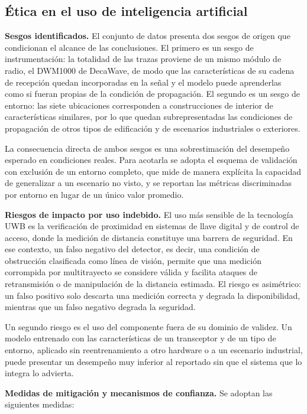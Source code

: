 \documentclass[
11pt, %
]{charter}
\begin{document}
\subsection{Ética en el uso de inteligencia artificial}

\textbf{Sesgos identificados.} El conjunto de datos presenta dos sesgos de origen que condicionan el alcance de las conclusiones. El primero es un sesgo de instrumentación: la totalidad de las trazas proviene de un mismo módulo de radio, el DWM1000 de DecaWave, de modo que las características de su cadena de recepción quedan incorporadas en la señal y el modelo puede aprenderlas como si fueran propias de la condición de propagación. El segundo es un sesgo de entorno: las siete ubicaciones corresponden a construcciones de interior de características similares, por lo que quedan subrepresentadas las condiciones de propagación de otros tipos de edificación y de escenarios industriales o exteriores.

La consecuencia directa de ambos sesgos es una sobrestimación del desempeño esperado en condiciones reales. Para acotarla se adopta el esquema de validación con exclusión de un entorno completo, que mide de manera explícita la capacidad de generalizar a un escenario no visto, y se reportan las métricas discriminadas por entorno en lugar de un único valor promedio.

\textbf{Riesgos de impacto por uso indebido.} El uso más sensible de la tecnología UWB es la verificación de proximidad en sistemas de llave digital y de control de acceso, donde la medición de distancia constituye una barrera de seguridad. En ese contexto, un falso negativo del detector, es decir, una condición de obstrucción clasificada como línea de visión, permite que una medición corrompida por multitrayecto se considere válida y facilita ataques de retransmisión o de manipulación de la distancia estimada. El riesgo es asimétrico: un falso positivo solo descarta una medición correcta y degrada la disponibilidad, mientras que un falso negativo degrada la seguridad.

Un segundo riesgo es el uso del componente fuera de su dominio de validez. Un modelo entrenado con las características de un transceptor y de un tipo de entorno, aplicado sin reentrenamiento a otro hardware o a un escenario industrial, puede presentar un desempeño muy inferior al reportado sin que el sistema que lo integra lo advierta.

\textbf{Medidas de mitigación y mecanismos de confianza.} Se adoptan las siguientes medidas:
\end{document}
